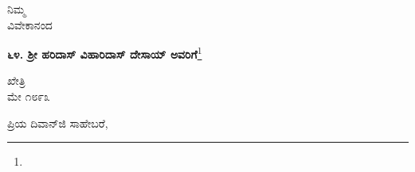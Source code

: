 \vspace{-0.55cm}

{\flushright
ನಿಮ್ಮ\\ವಿವೇಕಾನಂದ\par}

\begin{center}
\textbf{೬೪. ಶ‍್ರೀ ಹರಿದಾಸ್ ವಿಹಾರಿದಾಸ್ ದೇಸಾಯ್ ಅವರಿಗೆ}\footnote{}
\end{center}

\vspace{-0.45cm}

\begin{flushright}
ಖೇತ್ರಿ\\ಮೇ ೧೮೯೩
\end{flushright}

\vspace{-0.5cm}

\noindent
ಪ್ರಿಯ ದಿವಾನ್‌ಜಿ ಸಾಹೇಬರೆ,

